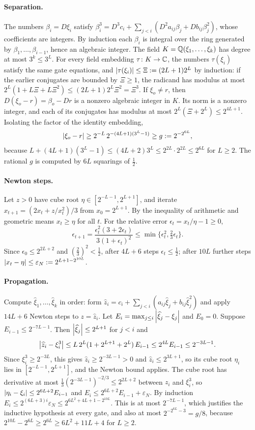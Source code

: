 \paragraph{Separation.}
The numbers $\beta_i=D\xi_i$ satisfy
$\beta_i^3=D^3c_i+\sum_{j<i}(D^2a_{ij}\beta_j+Db_{ij}\beta_j^2)$, whose
coefficients are integers. By induction each $\beta_i$ is integral over the
ring generated by $\beta_1,\ldots,\beta_{i-1}$, hence an algebraic integer.
The field $K=\mathbb Q(\xi_1,\ldots,\xi_k)$ has degree at most $3^k\le3^L$. For every
field embedding $\tau\colon K\to\mathbb C$, the numbers $\tau(\xi_i)$ satisfy the same
gate equations, and $\left\lvert\tau(\xi_i)\right\rvert\le\Xi:=(2L+1)2^L$ by induction: if the
earlier conjugates are bounded by $\Xi\ge1$, the radicand has modulus at most
$2^L(1+L\Xi+L\Xi^2)\le(2L+1)2^L\Xi^2=\Xi^3$. If $\xi_o\ne r$, then
$D(\xi_o-r)=\beta_o-Dr$ is a nonzero algebraic integer in $K$. Its norm is a
nonzero integer, and each of its conjugates has modulus at most
$2^L(\Xi+2^L)\le2^{4L+1}$. Isolating the factor of the identity embedding,
\[
 \left\lvert\xi_o-r\right\rvert\ge2^{-L}\,2^{-(4L+1)(3^L-1)}\ge g:=2^{-2^{6L}},
\]
because $L+(4L+1)(3^L-1)\le(4L+2)3^L\le2^{2L}\cdot2^{2L}\le2^{6L}$ for $L\ge2$.
The rational $g$ is computed by $6L$ squarings of $\frac12$.

\paragraph{Newton steps.}
Let $z>0$ have cube root $\eta\in[2^{-L-1},2^{L+1}]$, and iterate
$x_{t+1}=(2x_t+z/x_t^2)/3$ from $x_0=2^{L+1}$. By the inequality of arithmetic
and geometric means $x_t\ge\eta$ for all $t$. For the relative error
$\epsilon_t=x_t/\eta-1\ge0$,
\[
 \epsilon_{t+1}=\frac{\epsilon_t^2(3+2\epsilon_t)}{3(1+\epsilon_t)^2}
 \le\min\bigl\{\epsilon_t^2,\tfrac23\epsilon_t\bigr\}.
\]
Since $\epsilon_0\le2^{2L+2}$ and $(\frac23)^2<\frac12$, after $4L+6$ steps
$\epsilon_t\le\frac12$; after $10L$ further steps
$\left\lvert x_t-\eta\right\rvert\le\varepsilon_N:=2^{L+1-2^{10L}}$.

\paragraph{Propagation.}
Compute $\widehat\xi_1,\ldots,\widehat\xi_k$ in order: form
$\widehat z_i=c_i+\sum_{j<i}(a_{ij}\widehat\xi_j+b_{ij}\widehat\xi_j^2)$ and apply
$14L+6$ Newton steps to $z=\widehat z_i$. Let
$E_i=\max_{j\le i}\left\lvert\widehat\xi_j-\xi_j\right\rvert$ and $E_0=0$. Suppose
$E_{i-1}\le2^{-7L-1}$. Then $\left\lvert\widehat\xi_j\right\rvert\le2^{L+1}$ for $j<i$ and
\[
 \left\lvert\widehat z_i-\xi_i^3\right\rvert\le L\,2^L(1+2^{L+1}+2^L)\,E_{i-1}\le2^{4L}E_{i-1}
 \le2^{-3L-1}.
\]
Since $\xi_i^3\ge2^{-3L}$, this gives $\widehat z_i\ge2^{-3L-1}>0$ and
$\widehat z_i\le2^{3L+1}$, so its cube root $\eta_i$ lies in
$[2^{-L-1},2^{L+1}]$, and the Newton bound applies. The cube root has derivative
at most $\frac13(2^{-3L-1})^{-2/3}\le2^{2L+2}$ between $\widehat z_i$ and
$\xi_i^3$, so $\left\lvert\eta_i-\xi_i\right\rvert\le2^{6L+2}E_{i-1}$ and
$E_i\le2^{6L+2}E_{i-1}+\varepsilon_N$. By induction
$E_i\le2^{(6L+3)i}\varepsilon_N\le2^{6L^2+4L+1-2^{10L}}$. This is at most
$2^{-7L-1}$, which justifies the inductive hypothesis at every gate, and also at
most $2^{-2^{6L}-3}=g/8$, because $2^{10L}-2^{6L}\ge2^{6L}\ge6L^2+11L+4$ for
$L\ge2$.

